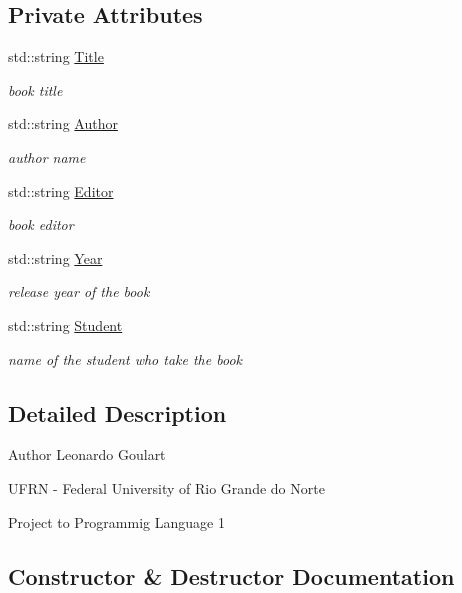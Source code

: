 \subsection*{Private Attributes}
\begin{DoxyCompactItemize}
\item 
std\+::string \hyperlink{classBook_a862b94a2fd16ac90209afa4393d8df8a}{Title}
\begin{DoxyCompactList}\small\item\em book title \end{DoxyCompactList}\item 
std\+::string \hyperlink{classBook_a12872f571d8e7c5bfa31f4142e7848eb}{Author}
\begin{DoxyCompactList}\small\item\em author name \end{DoxyCompactList}\item 
std\+::string \hyperlink{classBook_a18602b69a54cf1533569ac857681b03f}{Editor}
\begin{DoxyCompactList}\small\item\em book editor \end{DoxyCompactList}\item 
std\+::string \hyperlink{classBook_ad3fc2c944e788d179c4d836f36662ae2}{Year}
\begin{DoxyCompactList}\small\item\em release year of the book \end{DoxyCompactList}\item 
std\+::string \hyperlink{classBook_ae89daf9343a917dced86da884961ed3a}{Student}
\begin{DoxyCompactList}\small\item\em name of the student who take the book \end{DoxyCompactList}\end{DoxyCompactItemize}


\subsection{Detailed Description}
\begin{DoxyAuthor}{Author}
Leonardo Goulart 

U\+F\+RN -\/ Federal University of Rio Grande do Norte 

Project to Programmig Language 1 
\end{DoxyAuthor}


\subsection{Constructor \& Destructor Documentation}
